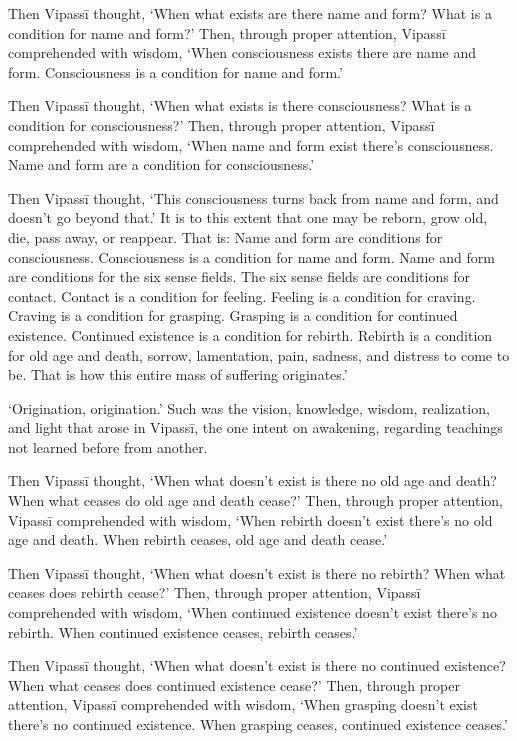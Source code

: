 \documentclass[12pt,openany]{book}%
\begin{document}
Then \textsanskrit{Vipassī} thought, ‘When what exists are there name and form? What is a condition for name and form?’ Then, through proper attention, \textsanskrit{Vipassī} comprehended with wisdom, ‘When consciousness exists there are name and form. Consciousness is a condition for name and form.’ 

Then \textsanskrit{Vipassī} thought, ‘When what exists is there consciousness? What is a condition for consciousness?’ Then, through proper attention, \textsanskrit{Vipassī} comprehended with wisdom, ‘When name and form exist there’s consciousness. Name and form are a condition for consciousness.’ 

Then \textsanskrit{Vipassī} thought, ‘This consciousness turns back from name and form, and doesn’t go beyond that.’ It is to this extent that one may be reborn, grow old, die, pass away, or reappear. That is: Name and form are conditions for consciousness. Consciousness is a condition for name and form. Name and form are conditions for the six sense fields. The six sense fields are conditions for contact. Contact is a condition for feeling. Feeling is a condition for craving. Craving is a condition for grasping. Grasping is a condition for continued existence. Continued existence is a condition for rebirth. Rebirth is a condition for old age and death, sorrow, lamentation, pain, sadness, and distress to come to be. That is how this entire mass of suffering originates.’ 

‘Origination, origination.’ Such was the vision, knowledge, wisdom, realization, and light that arose in \textsanskrit{Vipassī}, the one intent on awakening, regarding teachings not learned before from another. 

Then \textsanskrit{Vipassī} thought, ‘When what doesn’t exist is there no old age and death? When what ceases do old age and death cease?’ Then, through proper attention, \textsanskrit{Vipassī} comprehended with wisdom, ‘When rebirth doesn’t exist there’s no old age and death. When rebirth ceases, old age and death cease.’ 

Then \textsanskrit{Vipassī} thought, ‘When what doesn’t exist is there no rebirth? When what ceases does rebirth cease?’ Then, through proper attention, \textsanskrit{Vipassī} comprehended with wisdom, ‘When continued existence doesn’t exist there’s no rebirth. When continued existence ceases, rebirth ceases.’ 

Then \textsanskrit{Vipassī} thought, ‘When what doesn’t exist is there no continued existence? When what ceases does continued existence cease?’ Then, through proper attention, \textsanskrit{Vipassī} comprehended with wisdom, ‘When grasping doesn’t exist there’s no continued existence. When grasping ceases, continued existence ceases.’ 
\end{document}
